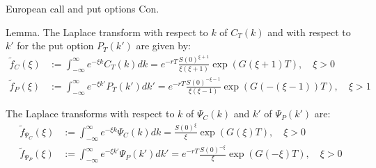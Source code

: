 \documentclass{beamer}
\begin{document}
\begin{frame}{European call and put options Con.}

    {\footnotesize \footnotesize
    \par Lemma. The Laplace transform with respect to \( k \) of \( C_T(k) \) and with respect to \( k' \) for 
    the put option \( P_T(k') \) are given by:
    \begin{align*}
        \tilde{f}_C(\xi) &:= \int_{-\infty}^{\infty} e^{-\xi k} C_T(k)  dk 
        = e^{-rT} \frac{S(0)^{\xi+1}}{\xi(\xi+1)} \exp(G(\xi+1)T), \quad \xi > 0\\
        \tilde{f}_P(\xi) &:= \int_{-\infty}^{\infty} e^{-\xi k'} P_T(k')  dk' 
        = e^{-rT} \frac{S(0)^{-\xi-1}}{\xi(\xi-1)} \exp(G(-(\xi-1))T), \quad \xi > 1
    \end{align*}
    \par The Laplace transforms with respect to \( k \)  of \( \Psi_C(k) \) and \( k' \) of \( \Psi_P(k') \) are:
    \begin{align*}
        \tilde{f}_{\Psi_C}(\xi) &:= \int_{-\infty}^{\infty} e^{-\xi k} \Psi_C(k)  dk = \frac{S(0)^{\xi}}{\xi} \exp(G(\xi)T), \quad \xi > 0\\
        \tilde{f}_{\Psi_P}(\xi) &:= \int_{-\infty}^{\infty} e^{-\xi k'} \Psi_P(k')  dk' = e^{-rT} \frac{S(0)^{-\xi}}{\xi} \exp(G(-\xi)T), \quad \xi > 0
    \end{align*}
    }
    
\end{frame}
\end{document}
